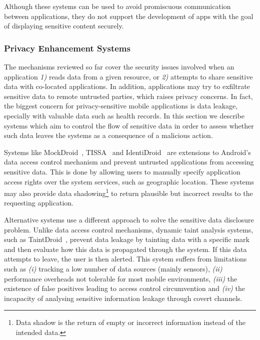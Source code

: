 Although these systems can be used to avoid promiscuous communication between applications, they do not support the development of apps with the goal of displaying sensitive content securely.

\subsubsection{Privacy Enhancement Systems}

The mechanisms reviewed so far cover the security issues involved when an application \emph{1)} reads data from a given resource, or \emph{2)} attempts to share sensitive data with co-located applications. In addition, applications may try to exfiltrate sensitive data to remote untrusted parties, which raises privacy concerns. In fact, the biggest concern for privacy-sensitive mobile applications is data leakage, specially with valuable data such as health records. In this section we describe systems which aim to control the flow of sensitive data in order to assess whether such data leaves the systems as a consequence of a malicious action.

Systems like MockDroid~\cite{beresford2011mockdroid}, TISSA~\cite{zhou2011taming} and IdentiDroid~\cite{shebaro2014identidroid} are extensions to Android's data access control mechanism and prevent untrusted applications from accessing sensitive data. This is done by allowing users to manually specify application access rights over the system services, such as geographic location. These systems may also provide data shadowing\footnote{Data shadow is the return of empty or incorrect information instead of the intended data.} to return plausible but incorrect results to the requesting application.

Alternative systems use a different approach to solve the sensitive data disclosure problem. Unlike data access control mechanisms, dynamic taint analysis systems, such as TaintDroid~\cite{enck2014taintdroid}, prevent data leakage by tainting data with a specific mark and then evaluate how this data is propagated through the system. If this data attempts to leave, the user is then alerted. This system suffers from limitations such as \emph{(i)} tracking a low number of data sources (mainly sensors), \emph{(ii)} performance overheads not tolerable for most mobile environments, \emph{(iii)} the existence of false positives leading to access control circumvention and \emph{(iv)} the incapacity of analysing sensitive information leakage through covert channels.

